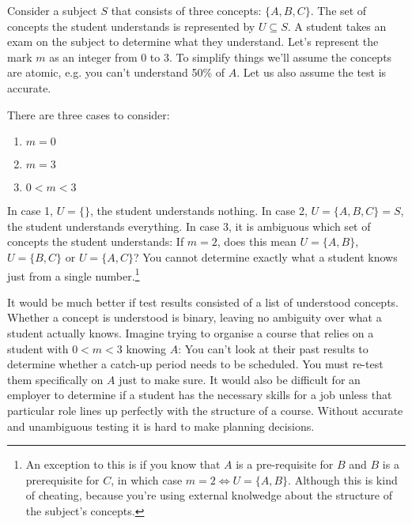         Consider a subject \(S\) that consists of three concepts: \(\{A, B, C\}\). The set of concepts the student understands is represented by \(U \subseteq S\). A student takes an exam on the subject to determine what they understand. Let's represent the mark \(m\) as an integer from 0 to 3. To simplify things we'll assume the concepts are atomic, e.g. you can't understand 50\% of \(A\). Let us also assume the test is accurate.

        There are three cases to consider:

        \begin{enumerate}
          \item \(m = 0\)
          \item \(m = 3\)
          \item \(0 < m < 3\)
        \end{enumerate}

        In case 1, \(U = \{\}\), the student understands nothing. In case 2, \(U = \{A, B, C\} = S\), the student understands everything. In case 3, it is ambiguous which set of concepts the student understands: If \(m = 2\), does this mean \(U = \{A, B\}\), \(U = \{B, C\}\) or \(U = \{A, C\}\)? You cannot determine exactly what a student knows just from a single number.\footnote{An exception to this is if you know that \(A\) is a pre-requisite for \(B\) and \(B\) is a prerequisite for \(C\), in which case \(m = 2 \iff U = \{A, B\}\). Although this is kind of cheating, because you're using external knolwedge about the structure of the subject's concepts.}

        It would be much better if test results consisted of a list of understood concepts. Whether a concept is understood is binary, leaving no ambiguity over what a student actually knows. Imagine trying to organise a course that relies on a student with \(0 < m < 3\) knowing \(A\): You can't look at their past results to determine whether a catch-up period needs to be scheduled. You must re-test them specifically on \(A\) just to make sure. It would also be difficult for an employer to determine if a student has the necessary skills for a job unless that particular role lines up perfectly with the structure of a course. Without accurate and unambiguous testing it is hard to make planning decisions.


